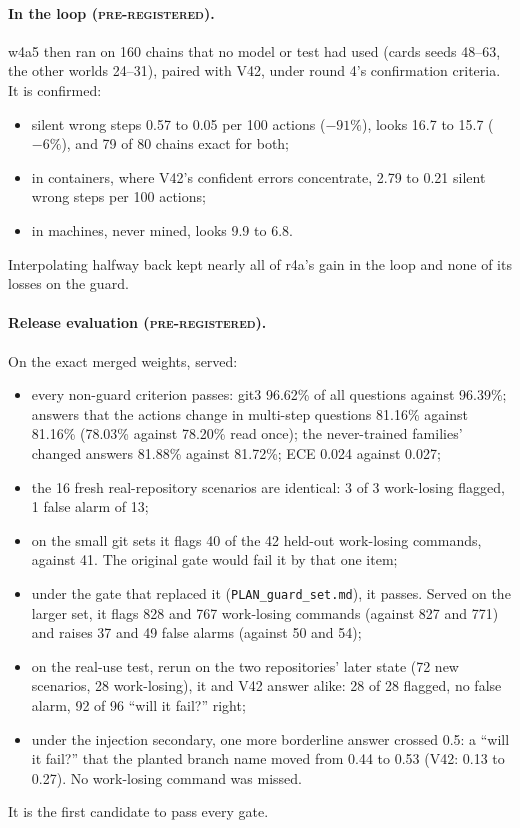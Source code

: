 \documentclass[11pt]{article}
\newcommand{\prereg}{\textsc{pre-registered}}
\begin{document}
\paragraph{In the loop (\prereg).} w4a5 then ran on 160 chains that no model or test had used (cards seeds 48--63, the
other worlds 24--31), paired with V42, under round 4's confirmation criteria. It is confirmed:
\begin{itemize}
  \item silent wrong steps 0.57 to 0.05 per 100 actions ($-91\%$), looks 16.7 to 15.7 ($-6\%$), and 79 of 80 chains exact
  for both;
  \item in containers, where V42's confident errors concentrate, 2.79 to 0.21 silent wrong steps per 100
  actions;
  \item in machines, never mined, looks 9.9 to 6.8.
\end{itemize}
Interpolating halfway back kept nearly all of r4a's gain in the loop and none of its losses on the guard.

\paragraph{Release evaluation (\prereg).} On the exact merged weights, served:
\begin{itemize}
  \item every non-guard criterion passes: git3 96.62\% of all questions against 96.39\%; answers that the actions
  change in multi-step questions 81.16\% against 81.16\% (78.03\% against 78.20\% read once); the never-trained
  families' changed answers 81.88\% against 81.72\%; ECE 0.024 against 0.027;
  \item the 16 fresh real-repository scenarios are identical: 3 of 3 work-losing flagged, 1 false alarm of 13;
  \item on the small git sets it flags 40 of the 42 held-out work-losing commands, against 41. The original gate would
  fail it by that one item;
  \item under the gate that replaced it (\texttt{PLAN\_guard\_set.md}), it passes. Served on the larger set, it flags 828
  and 767 work-losing commands (against 827 and 771) and raises 37 and 49 false alarms (against 50 and 54);
  \item on the real-use test, rerun on the two repositories' later state (72 new scenarios, 28 work-losing), it and V42 answer alike: 28 of 28 flagged, no false alarm, 92 of 96 ``will it fail?'' right;
  \item under the injection secondary, one more borderline answer crossed 0.5: a ``will it fail?'' that the planted
  branch name moved from 0.44 to 0.53 (V42: 0.13 to 0.27). No work-losing command was missed.
\end{itemize}
It is the first candidate to pass every gate.
\end{document}
